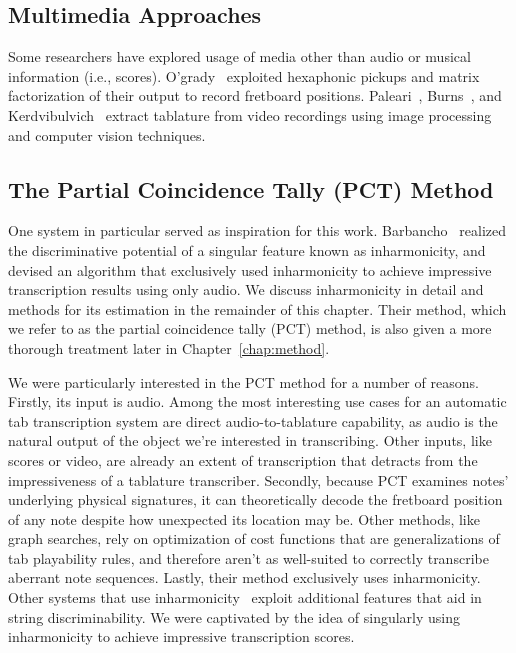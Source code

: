 \documentclass[12pt]{cmuthesis}
\begin{document}
\subsection{Multimedia Approaches}
Some researchers have explored usage of media other than audio or musical information (i.e., scores). O'grady~\cite{ogrady2009} exploited hexaphonic pickups and matrix factorization of their output to record fretboard positions. Paleari~\cite{paleari2008}, Burns~\cite{burns2006}, and Kerdvibulvich~\cite{kerd2007} extract tablature from video recordings using image processing and computer vision techniques.

\subsection{The Partial Coincidence Tally (PCT) Method}
One system in particular served as inspiration for this work. Barbancho~\cite{barbanchoi2012} realized the discriminative potential of a singular feature known as inharmonicity, and devised an algorithm that exclusively used inharmonicity to achieve impressive transcription results using only audio. We discuss inharmonicity in detail and methods for its estimation in the remainder of this chapter. Their method, which we refer to as the partial coincidence tally (PCT) method, is also given a more thorough treatment later in Chapter~\ref{chap:method}.

We were particularly interested in the PCT method for a number of reasons. Firstly, its input is audio. Among the most interesting use cases for an automatic tab transcription system are direct audio-to-tablature capability, as audio is the natural output of the object we're interested in transcribing. Other inputs, like scores or video, are already an extent of transcription that detracts from the impressiveness of a tablature transcriber. Secondly, because PCT examines notes' underlying physical signatures, it can theoretically decode the fretboard position of any note despite how unexpected its location may be. Other methods, like graph searches, rely on optimization of cost functions that are generalizations of tab playability rules, and therefore aren't as well-suited to correctly transcribe aberrant note sequences. Lastly, their method exclusively uses inharmonicity. Other systems that use inharmonicity~\cite{barbancho2009,abesser2012,dittmar2013,kehling2014} exploit additional features that aid in string discriminability. We were captivated by the idea of singularly using inharmonicity to achieve impressive transcription scores.
\end{document}
